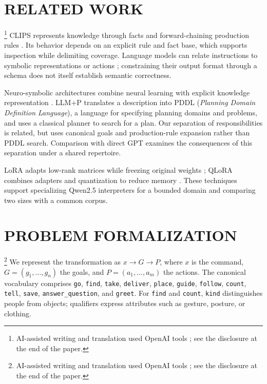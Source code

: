\documentclass[a4paper,twoside]{article}
\begin{document}
\section{RELATED WORK}\footnote{AI-assisted writing and translation used OpenAI tools \cite{openai_assistance}; see the disclosure at the end of the paper.}
CLIPS represents knowledge through facts and forward-chaining production rules \cite{NASA_CLIPS,Giarratano2005}. Its behavior depends on an explicit rule and fact base, which supports inspection while delimiting coverage. Language models can relate instructions to symbolic representations or actions \cite{Shi2023}; constraining their output format through a schema does not itself establish semantic correctness.

Neuro-symbolic architectures combine neural learning with explicit knowledge representation \cite{garcez2015neural,besold2017neural}. LLM+P \cite{liu2023llmp} translates a description into PDDL (\emph{Planning Domain Definition Language}), a language for specifying planning domains and problems, and uses a classical planner to search for a plan. Our separation of responsibilities is related, but uses canonical goals and production-rule expansion rather than PDDL search. Comparison with direct GPT examines the consequences of this separation under a shared repertoire.

LoRA adapts low-rank matrices while freezing original weights \cite{hu2022lora}; QLoRA combines adapters and quantization to reduce memory \cite{dettmers2023qlora}. These techniques support specializing Qwen2.5 interpreters \cite{yang2024qwen25} for a bounded domain and comparing two sizes with a common corpus.



\section{PROBLEM FORMALIZATION}\footnote{AI-assisted writing and translation used OpenAI tools \cite{openai_assistance}; see the disclosure at the end of the paper.}
We represent the transformation as $x\rightarrow G\rightarrow P$, where $x$ is the command, $G=(g_1,\ldots,g_n)$ the goals, and $P=(a_1,\ldots,a_m)$ the actions. The canonical vocabulary comprises \texttt{go}, \texttt{find}, \texttt{take}, \texttt{deliver}, \texttt{place}, \texttt{guide}, \texttt{follow}, \texttt{count}, \texttt{tell}, \texttt{save}, \texttt{answer\_question}, and \texttt{greet}. For \texttt{find} and \texttt{count}, \texttt{kind} distinguishes people from objects; qualifiers express attributes such as gesture, posture, or clothing.
\end{document}

